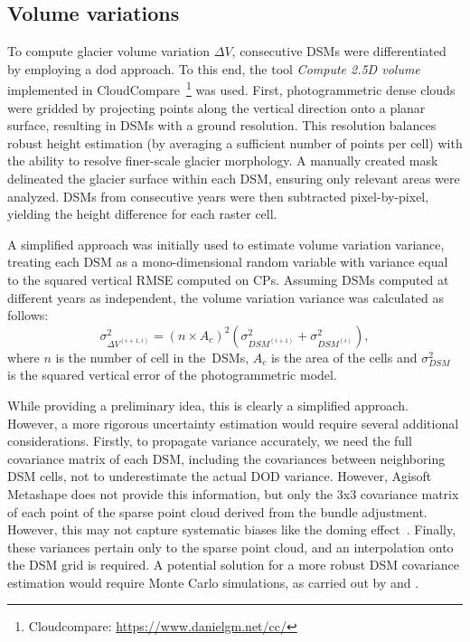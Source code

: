\subsection{Volume variations}\label{sec:3:method_volumes}

To compute glacier volume variation $ \Delta V $, consecutive DSMs were differentiated by employing a \ac{dod} approach.
To this end, the tool \textit{Compute 2.5D volume} implemented in 
CloudCompare~\footnote{Cloudcompare: \url{https://www.danielgm.net/cc/}} was used.
First, photogrammetric dense clouds were gridded by projecting points along the vertical direction onto a planar surface, resulting in DSMs with a  ground resolution.
This resolution balances robust height estimation (by averaging a sufficient number of points per cell) with the ability to resolve finer-scale glacier morphology.
A manually created mask delineated the glacier surface within each DSM, ensuring only relevant areas were analyzed.  
DSMs from consecutive years were then subtracted pixel-by-pixel, yielding the height difference for each raster cell.

A simplified approach was initially used to estimate volume variation variance, 
treating each DSM as a mono-dimensional random variable with variance equal to the squared 
vertical RMSE computed on CPs.
Assuming DSMs computed at different years as independent, the volume variation variance 
was calculated as follows:
\begin{equation}
    \sigma^2_{\Delta V^{(i+1,i)}}  = {(n \times A_c)}^2 \left( \sigma^2
    _{DSM^{(i+1)}} + \sigma^2_{DSM^{(i)}} \right),
    \label{eq:3:volVarProp}
\end{equation}
where $ n $ is the number of cell in the~DSMs, $A_c$ is the area of the cells
and $ \sigma^2 _{DSM}$ is the squared vertical error of the photogrammetric model.

While providing a preliminary idea, this is clearly a simplified approach. 
However, a more rigorous uncertainty estimation would require several additional considerations.
Firstly, to propagate variance accurately, we need the full covariance matrix of each DSM, 
including the covariances between neighboring DSM cells, not to underestimate the actual DOD variance. 
However, Agisoft Metashape does not provide this information, but only the 3x3 covariance matrix of each point of the sparse point cloud derived from the bundle adjustment.
However, this may not capture systematic biases like the doming effect~\citep{James2014_mitigating, James2020_mitigating2}.
Finally, these variances pertain only to the sparse point cloud, and an interpolation onto the DSM grid is required.
A potential solution for a more robust DSM covariance estimation would require Monte Carlo simulations, as carried out by \citet{James2017_3duncertainty} and \citet{Roncella2021_montecarlo}.

